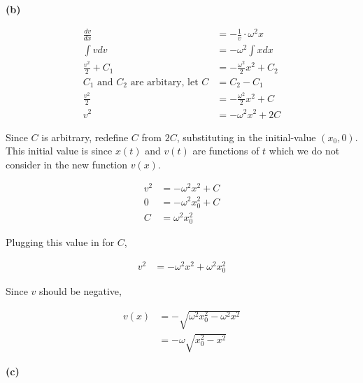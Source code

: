 \documentclass{article}
\begin{document}
    \textbf{(b)}

    \begin{align*}
        \frac{dv}{dx}   &= -\frac{1}{v} \cdot \omega^2 x \\
        \int vdv        &= -\omega^2 \int x dx \\
        \frac{v^2}{2} + C_1     &= -\frac{\omega^2}{2}x^2 + C_2 \\
        \text{$C_1$ and $C_2$ are arbitary, let } C &= C_2 - C_1 \\
        \frac{v^2}{2}   &= -\frac{\omega^2}{2}x^2 + C \\
        v^2             &= -\omega^{2}x^2 + 2C
    \end{align*}

    Since $C$ is arbitrary, redefine $C$ from $2C$, substituting in the initial-value $(x_0,0)$. This initial value is since $x(t)$ and $v(t)$ are functions of $t$ which we do not consider in the new function $v(x)$.

    \begin{align*}
        v^2 &= -\omega^2 x^2 + C \\
        0   &= -\omega^2 x_0^2 + C \\
        C   &= \omega^2 x_0^2
    \end{align*}

    Plugging this value in for $C$,

    \begin{align*}
        v^2 &= -\omega^2 x^2 + \omega^2 x_0^2
    \end{align*}

    Since $v$ should be negative,

    \begin{align*}
        v(x)    &= -\sqrt{\omega^2 x_0^2 - \omega^2 x^2} \\
                &= -\omega\sqrt{x_0^2 - x^2}
    \end{align*}

    \pagebreak
    \thispagestyle{3}

    \textbf{(c)}
\end{document}
